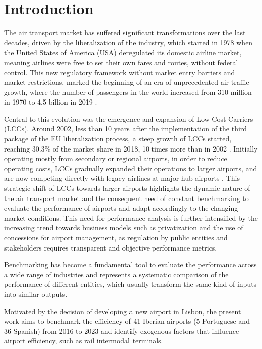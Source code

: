 
\section{Introduction}
\label{sec:intro}

The air transport market has suffered significant transformations over the last decades, driven by the
liberalization of the industry, which started in 1978 when the United States of America (USA) deregulated
its domestic airline market, meaning airlines were free to set their own fares and routes, without federal
control. This new regulatory framework without market entry
barriers and market restrictions, marked the beginning of an era of unprecedented air traffic growth, where the number of passengers in the world increased from 310 million in 1970 to 4.5 billion in 2019 \cite{baltagi1995}\cite{worldevolution}.

Central to this evolution was the emergence and expansion of Low-Cost Carriers (LCCs). Around 2002, less than 10 years after the implementation of the third package of the EU liberalization process, a steep growth of LCCs started, reaching
30.3\% of the market share in 2018, 10 times more than in 2002 \cite{sharelcc}. Initially operating mostly from secondary or regional airports, in order to reduce operating costs,
LCCs gradually expanded their operations to larger airports, and are now competing directly with legacy
airlines at major hub airports \cite{jimenez2020}. This strategic shift of LCCs towards larger airports highlights
the dynamic nature of the air transport market and the consequent need of constant benchmarking to evaluate the performance of airports and adapt accordingly to the changing market conditions. This need for performance analysis is further intensified by the increasing trend towards business
models such as privatization and the use of concessions for airport management, as regulation by public
entities and stakeholders requires transparent and objective performance metrics.

Benchmarking has become a fundamental tool to evaluate the performance across a wide range of
industries and represents a systematic comparison of the performance of different entities, which usually
transform the same kind of inputs into similar outputs.


Motivated by the decision of developing a new airport in Lisbon, the present work aims to benchmark the efficiency of 41 Iberian airports (5 Portuguese and 36 Spanish) from 2016 to
2023 and identify exogenous factors that influence airport efficiency, such as rail intermodal terminals.